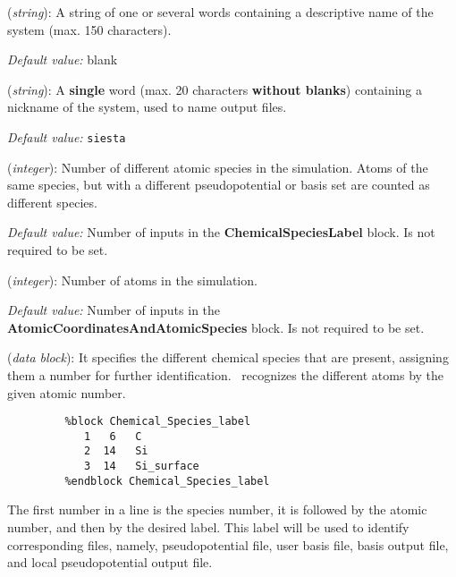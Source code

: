 \begin{description}
\itemsep 10pt
\parsep 0pt

\item[\textbf{SystemName}] (\textit{string}):
A string of one or several words containing a descriptive
name of the system (max. 150 characters).

\textit{Default value:} blank

\item[\textbf{SystemLabel}] (\textit{string}):
A \textbf{single} word (max. 20 characters \textbf{without blanks})
containing a nickname of the system, used to name output files.

\textit{Default value:} \texttt{siesta}

\item[\textbf{NumberOfSpecies}] (\textit{integer}):
Number of different atomic species in the simulation.
Atoms of the same species, but with a different
pseudopotential or basis set are counted as different species.

\textit{Default value:} Number of inputs in the \textbf{ChemicalSpeciesLabel}
block. Is not required to be set.

\item[\textbf{NumberOfAtoms}] (\textit{integer}):
Number of atoms in the simulation.

\textit{Default value:} Number of inputs in the \textbf{AtomicCoordinatesAndAtomicSpecies}
block. Is not required to be set.

\item[\textbf{ChemicalSpeciesLabel}] (\textit{data block}):
It specifies the different chemical species that are present,
assigning them a number for further identification.
\siesta\ recognizes the different atoms by the given atomic number.

\begin{verbatim}
         %block Chemical_Species_label
            1   6   C
            2  14   Si
            3  14   Si_surface
         %endblock Chemical_Species_label
\end{verbatim}

The first number in a line is the species number, it is followed by the
atomic number, and then by the desired label. This label will be used
to identify corresponding files, namely, pseudopotential file, user basis
file, basis output file, and local pseudopotential output file.


\end{description}
